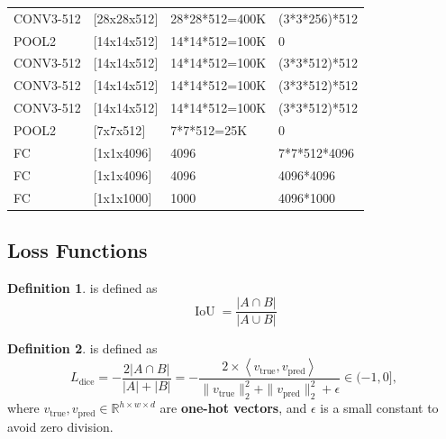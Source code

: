 \documentclass[a4paper]{article}
\theoremstyle{definition}
\newtheorem{definition}{Definition}
\theoremstyle{plain}
\begin{document}
\begin{table}[H]
\begin{tabular}{llll}
CONV3-512                          & {[}28x28x512{]}                   & 28*28*512=400K                      & (3*3*256)*512            \\
POOL2                              & {[}14x14x512{]}                   & 14*14*512=100K                      & 0                        \\
CONV3-512                          & {[}14x14x512{]}                   & 14*14*512=100K                      & (3*3*512)*512            \\
CONV3-512                          & {[}14x14x512{]}                   & 14*14*512=100K                      & (3*3*512)*512            \\
CONV3-512                          & {[}14x14x512{]}                   & 14*14*512=100K                      & (3*3*512)*512            \\
POOL2                              & {[}7x7x512{]}                     & 7*7*512=25K                         & 0                        \\
FC                                 & {[}1x1x4096{]}                    & 4096                                & 7*7*512*4096             \\
FC                                 & {[}1x1x4096{]}                    & 4096                                & 4096*4096                \\
FC                                 & {[}1x1x1000{]}                    & 1000                                & 4096*1000                \\ \hline
\end{tabular}
\end{table}

\subsection{Loss Functions}
\begin{definition}
 is defined as 
\begin{equation*}
    \operatorname{IoU}=\frac{|A\cap B|}{|A\cup B|}
\end{equation*}
\end{definition}

\begin{definition}
 is defined as 
\begin{equation*}
    L_{\operatorname{dice}}=-\frac{2|A\cap B|}{|A|+|B|}=-\frac{2\times\left<v_{\operatorname{true}}, v_{\operatorname{pred}}\right>}{\|v_{\operatorname{true}}\|^2_2+\|v_{\operatorname{pred}}\|^2_2+\epsilon}\in(-1,0],
\end{equation*}
where $v_{\operatorname{true}},v_{\operatorname{pred}}\in\mathbb{R}^{h\times w\times d}$ are \textbf{one-hot vectors}, and $\epsilon$ is a small constant to avoid zero division. 
\end{definition}
\end{document}
